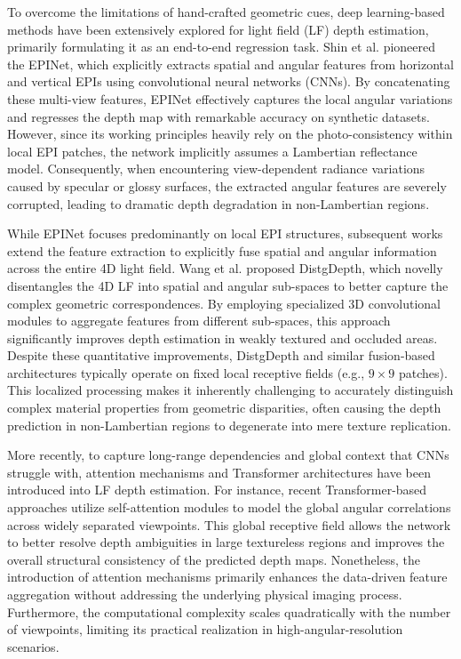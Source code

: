 To overcome the limitations of hand-crafted geometric cues, deep learning-based methods have been extensively explored for light field (LF) depth estimation, primarily formulating it as an end-to-end regression task. Shin et al.  pioneered the EPINet, which explicitly extracts spatial and angular features from horizontal and vertical EPIs using convolutional neural networks (CNNs). By concatenating these multi-view features, EPINet effectively captures the local angular variations and regresses the depth map with remarkable accuracy on synthetic datasets. However, since its working principles heavily rely on the photo-consistency within local EPI patches, the network implicitly assumes a Lambertian reflectance model. Consequently, when encountering view-dependent radiance variations caused by specular or glossy surfaces, the extracted angular features are severely corrupted, leading to dramatic depth degradation in non-Lambertian regions.

While EPINet focuses predominantly on local EPI structures, subsequent works extend the feature extraction to explicitly fuse spatial and angular information across the entire 4D light field. Wang et al.  proposed DistgDepth, which novelly disentangles the 4D LF into spatial and angular sub-spaces to better capture the complex geometric correspondences. By employing specialized 3D convolutional modules to aggregate features from different sub-spaces, this approach significantly improves depth estimation in weakly textured and occluded areas. Despite these quantitative improvements, DistgDepth and similar fusion-based architectures typically operate on fixed local receptive fields (e.g., \(9 \times 9\) patches). This localized processing makes it inherently challenging to accurately distinguish complex material properties from geometric disparities, often causing the depth prediction in non-Lambertian regions to degenerate into mere texture replication.

More recently, to capture long-range dependencies and global context that CNNs struggle with, attention mechanisms and Transformer architectures have been introduced into LF depth estimation. For instance, recent Transformer-based approaches  utilize self-attention modules to model the global angular correlations across widely separated viewpoints. This global receptive field allows the network to better resolve depth ambiguities in large textureless regions and improves the overall structural consistency of the predicted depth maps. Nonetheless, the introduction of attention mechanisms primarily enhances the data-driven feature aggregation without addressing the underlying physical imaging process. Furthermore, the computational complexity scales quadratically with the number of viewpoints, limiting its practical realization in high-angular-resolution scenarios.

